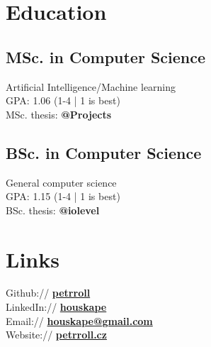 \documentclass[a4paper]{deedy-resume} %
\begin{document}
\begin{minipage}[t]{0.33\textwidth} %


\section{Education} 

\subsection{MSc. in Computer Science}
Artificial Intelligence/Machine learning \\
GPA: 1.06 (1-4 | 1 is best) \\
MSc. thesis: {\bf @Projects}

\sectionspace %

\subsection{BSc. in Computer Science}
General computer science \\
GPA: 1.15 (1-4 | 1 is best) \\
BSc. thesis: {\bf @iolevel}

\sectionspace %


\section{Links} 

Github:// \href{https://github.com/petrroll}{\bf petrroll} \\
LinkedIn:// \href{https://www.linkedin.com/in/houskape}{\bf houskape} \\
Email:// \href{mailto:houskape@gmail.com}{\bf houskape@gmail.com} \\
Website:// \href{http://www.petrroll.cz}{\bf petrroll.cz} \\


\end{minipage}
\end{document}
